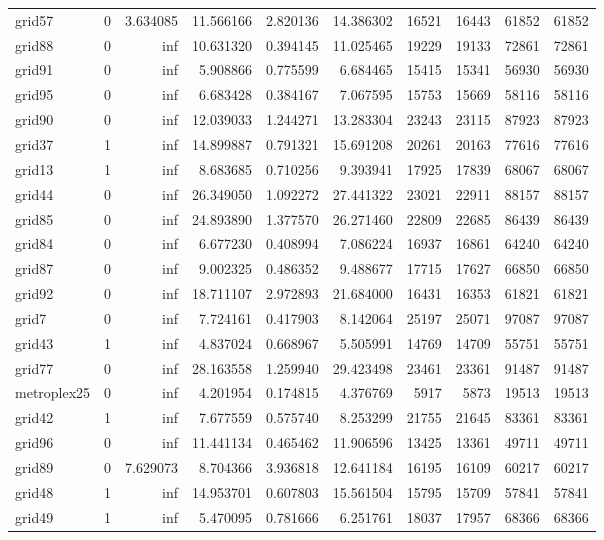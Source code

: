 \begin{longtable}{|l|r|r|r|r|r|r|r|r|r|}
grid57 & 0 & 3.634085 & 11.566166 & 2.820136 & 14.386302 & 16521 & 16443 & 61852 & 61852 \\
grid88 & 0 & inf & 10.631320 & 0.394145 & 11.025465 & 19229 & 19133 & 72861 & 72861 \\
grid91 & 0 & inf & 5.908866 & 0.775599 & 6.684465 & 15415 & 15341 & 56930 & 56930 \\
grid95 & 0 & inf & 6.683428 & 0.384167 & 7.067595 & 15753 & 15669 & 58116 & 58116 \\
grid90 & 0 & inf & 12.039033 & 1.244271 & 13.283304 & 23243 & 23115 & 87923 & 87923 \\
grid37 & 1 & inf & 14.899887 & 0.791321 & 15.691208 & 20261 & 20163 & 77616 & 77616 \\
grid13 & 1 & inf & 8.683685 & 0.710256 & 9.393941 & 17925 & 17839 & 68067 & 68067 \\
grid44 & 0 & inf & 26.349050 & 1.092272 & 27.441322 & 23021 & 22911 & 88157 & 88157 \\
grid85 & 0 & inf & 24.893890 & 1.377570 & 26.271460 & 22809 & 22685 & 86439 & 86439 \\
grid84 & 0 & inf & 6.677230 & 0.408994 & 7.086224 & 16937 & 16861 & 64240 & 64240 \\
grid87 & 0 & inf & 9.002325 & 0.486352 & 9.488677 & 17715 & 17627 & 66850 & 66850 \\
grid92 & 0 & inf & 18.711107 & 2.972893 & 21.684000 & 16431 & 16353 & 61821 & 61821 \\
grid7 & 0 & inf & 7.724161 & 0.417903 & 8.142064 & 25197 & 25071 & 97087 & 97087 \\
grid43 & 1 & inf & 4.837024 & 0.668967 & 5.505991 & 14769 & 14709 & 55751 & 55751 \\
grid77 & 0 & inf & 28.163558 & 1.259940 & 29.423498 & 23461 & 23361 & 91487 & 91487 \\
metroplex25 & 0 & inf & 4.201954 & 0.174815 & 4.376769 & 5917 & 5873 & 19513 & 19513 \\
grid42 & 1 & inf & 7.677559 & 0.575740 & 8.253299 & 21755 & 21645 & 83361 & 83361 \\
grid96 & 0 & inf & 11.441134 & 0.465462 & 11.906596 & 13425 & 13361 & 49711 & 49711 \\
grid89 & 0 & 7.629073 & 8.704366 & 3.936818 & 12.641184 & 16195 & 16109 & 60217 & 60217 \\
grid48 & 1 & inf & 14.953701 & 0.607803 & 15.561504 & 15795 & 15709 & 57841 & 57841 \\
grid49 & 1 & inf & 5.470095 & 0.781666 & 6.251761 & 18037 & 17957 & 68366 & 68366 \\

\end{longtable}
